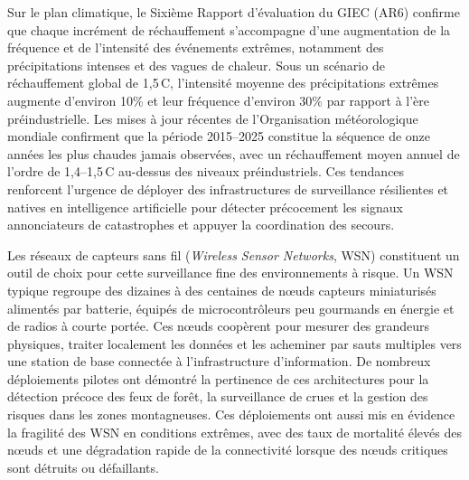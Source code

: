 Sur le plan climatique, le Sixième Rapport d'évaluation du GIEC (AR6) confirme que chaque incrément de réchauffement s'accompagne d'une augmentation de la fréquence et de l'intensité des événements extrêmes, notamment des précipitations intenses et des vagues de chaleur\cite{IPCC2021AR6}. Sous un scénario de réchauffement global de 1{,}5\,\textdegree C, l'intensité moyenne des précipitations extrêmes augmente d'environ 10\% et leur fréquence d'environ 30\% par rapport à l'ère préindustrielle\cite{IPCC2021AR6}. Les mises à jour récentes de l'Organisation météorologique mondiale confirment que la période 2015--2025 constitue la séquence de onze années les plus chaudes jamais observées, avec un réchauffement moyen annuel de l'ordre de 1{,}4--1{,}5\,\textdegree C au-dessus des niveaux préindustriels\cite{wmo2025climate}. Ces tendances renforcent l'urgence de déployer des infrastructures de surveillance résilientes et natives en intelligence artificielle pour détecter précocement les signaux annonciateurs de catastrophes et appuyer la coordination des secours.

Les réseaux de capteurs sans fil (\emph{Wireless Sensor Networks}, WSN) constituent un outil de choix pour cette surveillance fine des environnements à risque\cite{al_qundus_wireless_2020,yarali_wireless_2020}. Un WSN typique regroupe des dizaines à des centaines de nœuds capteurs miniaturisés alimentés par batterie, équipés de microcontrôleurs peu gourmands en énergie et de radios à courte portée. Ces nœuds coopèrent pour mesurer des grandeurs physiques, traiter localement les données et les acheminer par sauts multiples vers une station de base connectée à l'infrastructure d'information\cite{chong2003sensor,erdelj2017disaster}. De nombreux déploiements pilotes ont démontré la pertinence de ces architectures pour la détection précoce des feux de forêt, la surveillance de crues et la gestion des risques dans les zones montagneuses\cite{Aslan2012ForestFireWSN,biabani_energy-efficient_2020,dampage_forest_2022-1}. Ces déploiements ont aussi mis en évidence la fragilité des WSN en conditions extrêmes, avec des taux de mortalité élevés des nœuds et une dégradation rapide de la connectivité lorsque des nœuds critiques sont détruits ou défaillants\cite{AbuGhazaleh2007WSNSurvivability,erdelj2017disaster}.

